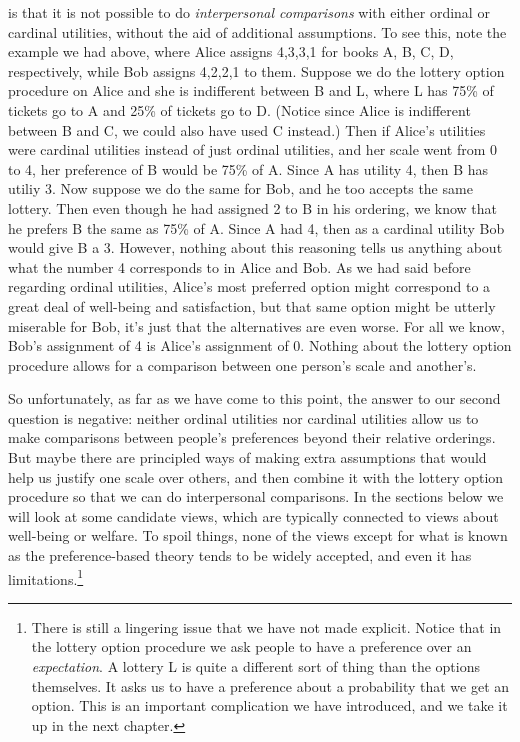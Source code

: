 \documentclass[]{tufte-book}
\begin{document}
 is that it is not possible to do \emph{interpersonal comparisons} with either ordinal or cardinal utilities, without the aid of additional assumptions. To see this, note the example we had above, where Alice assigns 4,3,3,1 for books A, B, C, D, respectively, while Bob assigns 4,2,2,1 to them. Suppose we do the lottery option procedure on Alice and she is indifferent between B and L, where L has 75\% of tickets go to A and 25\% of tickets go to D. (Notice since Alice is indifferent between B and C, we could also have used C instead.) Then if Alice's utilities were cardinal utilities instead of just ordinal utilities, and her scale went from 0 to 4, her preference of B would be 75\% of A. Since A has utility 4, then B has utiliy 3. Now suppose we do the same for Bob, and he too accepts the same lottery. Then even though he had assigned 2 to B in his ordering, we know that he prefers B the same as 75\% of A. Since A had 4, then as a cardinal utility Bob would give B a 3. However, nothing about this reasoning tells us anything about what the number 4 corresponds to in Alice and Bob. As we had said before regarding ordinal utilities, Alice's most preferred option might correspond to a great deal of well-being and satisfaction, but that same option might be utterly miserable for Bob, it's just that the alternatives are even worse. For all we know, Bob's assignment of 4 is Alice's assignment of 0. Nothing about the lottery option procedure allows for a comparison between one person's scale and another's.

So unfortunately, as far as we have come to this point, the answer to our second question is negative: neither ordinal utilities nor cardinal utilities allow us to make comparisons between people's preferences beyond their relative orderings. But maybe there are principled ways of making extra assumptions that would help us justify one scale over others, and then combine it with the lottery option procedure so that we can do interpersonal comparisons. In the sections below we will look at some candidate views, which are typically connected to views about well-being or welfare. To spoil things, none of the views except for what is known as the preference-based theory tends to be widely accepted, and even it has limitations.\footnote{There is still a lingering issue that we have not made explicit. Notice that in the lottery option procedure we ask people to have a preference over an \emph{expectation}. A lottery L is quite a different sort of thing than the options themselves. It asks us to have a preference about a probability that we get an option. This is an important complication we have introduced, and we take it up in the next chapter.}
\end{document}

